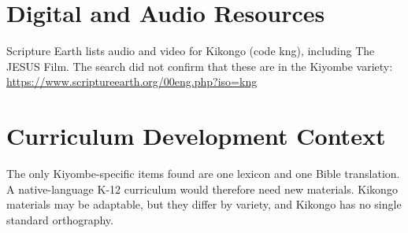 \documentclass[12pt]{article}
\begin{document}
\section{Digital and Audio Resources}
Scripture Earth lists audio and video for Kikongo (code kng), including The JESUS Film. The search did not confirm that these are in the Kiyombe variety: \url{https://www.scriptureearth.org/00eng.php?iso=kng}

\section{Curriculum Development Context}
The only Kiyombe-specific items found are one lexicon and one Bible translation. A native-language K-12 curriculum would therefore need new materials. Kikongo materials may be adaptable, but they differ by variety, and Kikongo has no single standard orthography.
\end{document}
